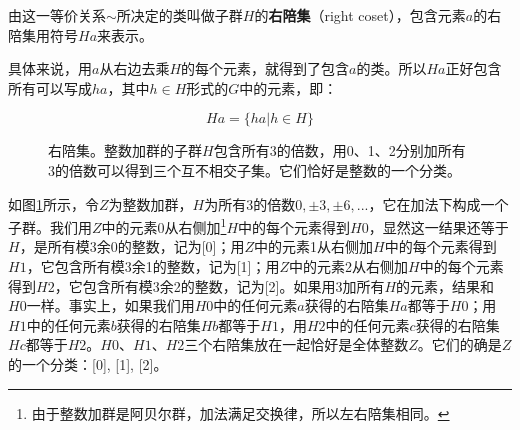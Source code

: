 \documentclass[b5paper]{ctexart}
\begin{document}
\begin{definition}
由这一等价关系$\sim$所决定的类叫做子群$H$的\textbf{右陪集}（right coset），包含元素$a$的右陪集用符号$Ha$来表示。
\end{definition}

具体来说，用$a$从右边去乘$H$的每个元素，就得到了包含$a$的类。所以$Ha$正好包含所有可以写成$ha$，其中$h \in H$形式的$G$中的元素，即：

\[
Ha = \{ha | h \in H\}
\]

\begin{figure}[htbp]
\centering
{}
\caption{右陪集。整数加群的子群$H$包含所有3的倍数，用0、1、2分别加所有3的倍数可以得到三个互不相交子集。它们恰好是整数的一个分类。}
\label{fig:right-cosets-Z3}
\end{figure}

如图\ref{fig:right-cosets-Z3}所示，令$Z$为整数加群，$H$为所有3的倍数$0, \pm 3, \pm 6, ...$，它在加法下构成一个子群。我们用$Z$中的元素0从右侧加\footnote{由于整数加群是阿贝尔群，加法满足交换律，所以左右陪集相同。}$H$中的每个元素得到$H0$，显然这一结果还等于$H$，是所有模3余0的整数，记为[0]；用$Z$中的元素1从右侧加$H$中的每个元素得到$H1$，它包含所有模3余1的整数，记为[1]；用$Z$中的元素2从右侧加$H$中的每个元素得到$H2$，它包含所有模3余2的整数，记为[2]。如果用3加所有$H$的元素，结果和$H0$一样。事实上，如果我们用$H0$中的任何元素$a$获得的右陪集$Ha$都等于$H0$；用$H1$中的任何元素$b$获得的右陪集$Hb$都等于$H1$，用$H2$中的任何元素$c$获得的右陪集$Hc$都等于$H2$。$H0$、$H1$、$H2$三个右陪集放在一起恰好是全体整数$Z$。它们的确是$Z$的一个分类：[0], [1], [2]。
\end{document}
